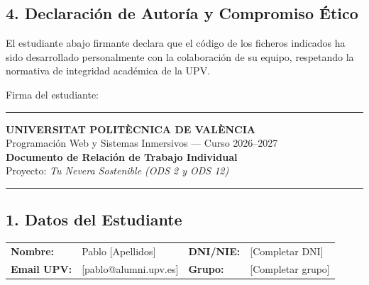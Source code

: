 \documentclass[11pt,a4paper]{article}
\begin{document}
\subsection*{4. Declaración de Autoría y Compromiso Ético}
El estudiante abajo firmante declara que el código de los ficheros indicados ha sido desarrollado personalmente con la colaboración de su equipo, respetando la normativa de integridad académica de la UPV.

\vspace{1.2cm}
\begin{flushright}
    Firma del estudiante:\ \rule{6cm}{0.4pt}
\end{flushright}

\newpage

\begin{center}
    {\Large \textbf{UNIVERSITAT POLITÈCNICA DE VALÈNCIA}}\\[0.2cm]
    {\large Programación Web y Sistemas Inmersivos --- Curso 2026--2027}\\[0.3cm]
    {\LARGE \textbf{\color{azulOscuro}Documento de Relación de Trabajo Individual}}\\[0.2cm]
    {\small Proyecto: \textit{Tu Nevera Sostenible (ODS 2 y ODS 12)}}
\end{center}

\vspace{0.3cm}
\hrule
\vspace{0.4cm}

\subsection*{1. Datos del Estudiante}
\begin{tabularx}{\textwidth}{l X l X}
    \textbf{Nombre:} & Pablo [Apellidos] & \textbf{DNI/NIE:} & [Completar DNI] \\
    \textbf{Email UPV:} & [pablo@alumni.upv.es] & \textbf{Grupo:} & [Completar grupo] \\
\end{tabularx}

\vspace{0.4cm}
\end{document}
